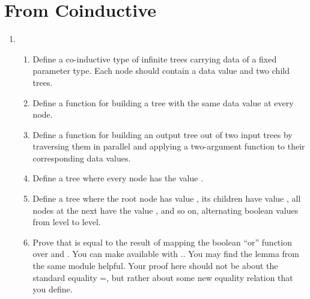 \documentclass[12pt]{report}
\begin{document}
\section{From Coinductive}



 \begin{enumerate}


\item \begin{enumerate}
  \item Define a co-inductive type of infinite trees carrying data of a fixed parameter type.  Each node should contain a data value and two child trees.
  \item Define a function  for building a tree with the same data value at every node.
  \item Define a function  for building an output tree out of two input trees by traversing them in parallel and applying a two-argument function to their corresponding data values.
  \item Define a tree  where every node has the value .
  \item Define a tree  where the root node has value , its children have value , all nodes at the next have the value , and so on, alternating boolean values from level to level.
  \item Prove that  is equal to the result of mapping the boolean ``or'' function  over  and .  You can make  available with   ..  You may find the lemma  from the same module helpful.  Your proof here should not be about the standard equality =, but rather about some new equality relation that you define.
\end{enumerate} 



\end{enumerate}
\end{document}
